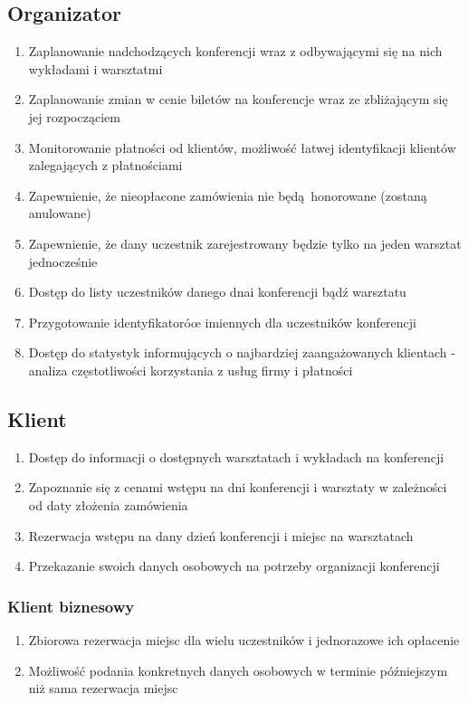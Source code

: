 \documentclass[12pt]{article}
\begin{document}
\subsection{Organizator}
\begin{enumerate}
\item Zaplanowanie nadchodzących konferencji wraz z odbywającymi się na nich wykładami i warsztatmi
\item Zaplanowanie zmian w cenie biletów na konferencje wraz ze zbliżającym się jej rozpocząciem
\item Monitorowanie płatności od klientów, możliwość łatwej identyfikacji klientów zalegających z płatnościami
\item Zapewnienie, że nieopłacone zamówienia nie będą honorowane (zostaną anulowane)
\item Zapewnienie, że dany uczestnik zarejestrowany będzie tylko na jeden warsztat jednocześnie
\item Dostęp do listy uczestników danego dnai konferencji bądź warsztatu
\item Przygotowanie identyfikatoróœ imiennych dla uczestników konferencji
\item Dostęp do statystyk informujących o najbardziej zaangażowanych klientach - analiza częstotliwości korzystania z usług firmy i płatności
\end{enumerate}

\subsection{Klient}
\begin{enumerate}
\item Dostęp do informacji o dostępnych warsztatach i wykładach na konferencji
\item Zapoznanie się z cenami wstępu na dni konferencji i warsztaty w zależności od daty złożenia zamówienia
\item Rezerwacja wstępu na dany dzień konferencji i miejsc na warsztatach
\item Przekazanie swoich danych osobowych na potrzeby organizacji konferencji
\end{enumerate}

\subsubsection{Klient biznesowy}
\begin{enumerate}
\item Zbiorowa rezerwacja miejsc dla wielu uczestników i jednorazowe ich opłacenie
\item Możliwość podania konkretnych danych osobowych w terminie późniejszym niż sama rezerwacja miejsc
\end{enumerate}
\end{document}
